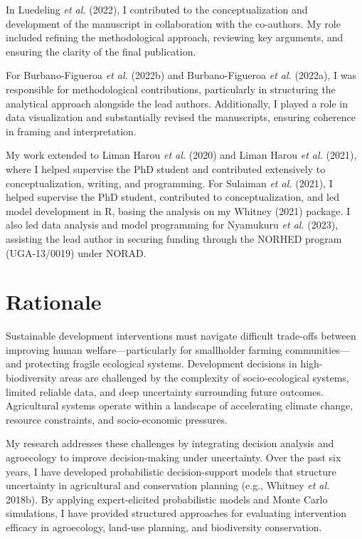 \documentclass[
]{article}
\begin{document}
In Luedeling \emph{et al.} (2022), I contributed to the
conceptualization and development of the manuscript in collaboration
with the co-authors. My role included refining the methodological
approach, reviewing key arguments, and ensuring the clarity of the final
publication.

For Burbano-Figueroa \emph{et al.} (2022b) and Burbano-Figueroa \emph{et
al.} (2022a), I was responsible for methodological contributions,
particularly in structuring the analytical approach alongside the lead
authors. Additionally, I played a role in data visualization and
substantially revised the manuscripts, ensuring coherence in framing and
interpretation.

My work extended to Liman Harou \emph{et al.} (2020) and Liman Harou
\emph{et al.} (2021), where I helped supervise the PhD student and
contributed extensively to conceptualization, writing, and programming.
For Sulaiman \emph{et al.} (2021), I helped supervise the PhD student,
contributed to conceptualization, and led model development in R, basing
the analysis on my Whitney (2021) package. I also led data analysis and
model programming for Nyamukuru \emph{et al.} (2023), assisting the lead
author in securing funding through the NORHED program (UGA-13/0019)
under NORAD.

\newpage

\hypertarget{rationale}{%
\section*{Rationale}\label{rationale}}

Sustainable development interventions must navigate difficult trade-offs
between improving human welfare---particularly for smallholder farming
communities---and protecting fragile ecological systems. Development
decisions in high-biodiversity areas are challenged by the complexity of
socio-ecological systems, limited reliable data, and deep uncertainty
surrounding future outcomes. Agricultural systems operate within a
landscape of accelerating climate change, resource constraints, and
socio-economic pressures.

My research addresses these challenges by integrating decision analysis
and agroecology to improve decision-making under uncertainty. Over the
past six years, I have developed probabilistic decision-support models
that structure uncertainty in agricultural and conservation planning
(e.g., Whitney \emph{et al.} 2018b). By applying expert-elicited
probabilistic models and Monte Carlo simulations, I have provided
structured approaches for evaluating intervention efficacy in
agroecology, land-use planning, and biodiversity conservation.
\end{document}
